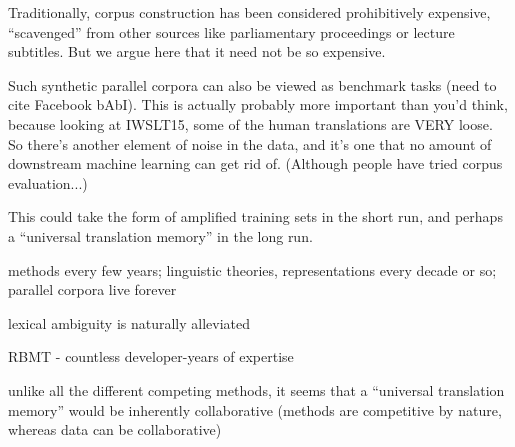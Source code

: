 Traditionally, corpus construction has been considered prohibitively expensive, ``scavenged'' from other sources like parliamentary proceedings or lecture subtitles.
But we argue here that it need not be so expensive.

Such synthetic parallel corpora can also be viewed as benchmark tasks (need to cite Facebook bAbI).
This is actually probably more important than you'd think, because looking at IWSLT15, some of the human translations are VERY loose.
So there's another element of noise in the data, and it's one that no amount of downstream machine learning can get rid of.
(Although people have tried corpus evaluation...)





This could take the form of amplified training sets in the short run, and perhaps a ``universal translation memory'' in the long run.

methods every few years; linguistic theories, representations every decade or so; parallel corpora live forever

lexical ambiguity is naturally alleviated

RBMT - countless developer-years of expertise

unlike all the different competing methods, it seems that a ``universal translation memory'' would be inherently collaborative (methods are competitive by nature, whereas data can be collaborative)






